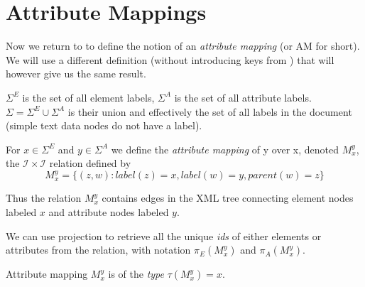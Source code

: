 




\section{Attribute Mappings}

Now we return to \cite{fidax} to define the notion of an \textit{attribute mapping} (or AM for short). 
We will use a different definition (without introducing keys from \cite{keX}) that will however give us the same result.

\begin{define}
	$\Sigma^E$ is the set of all element labels, $\Sigma^A$ is the set of all attribute labels. $\Sigma = \Sigma^E \cup \Sigma^A$ is their union and effectively the set of all labels in the document (simple text data nodes do not have a label).
\end{define}

\begin{define}
	For $x \in \Sigma^E$ and $y \in \Sigma^A$ we define the \textit{attribute mapping} of y over x, denoted $M_{x}^{y}$, the $\mathcal{I} \times \mathcal{I}$ relation defined by
	\[M_{x}^{y} = \{ (z,w): label(z) = x, label(w) = y, parent(w) = z \}\]
\end{define}

Thus the relation $M_{x}^{y}$ contains edges in the XML tree connecting element nodes labeled $x$ and attribute nodes labeled $y$.

We can use projection to retrieve all the unique \textit{ids} of either elements or attributes from the relation, with notation $\pi_E(M_{x}^{y})$ and $\pi_A(M_{x}^{y})$.

\begin{define}
	Attribute mapping $M_{x}^{y}$ is of the \textit{type} $\tau(M_{x}^{y}) = x$.
\end{define}

